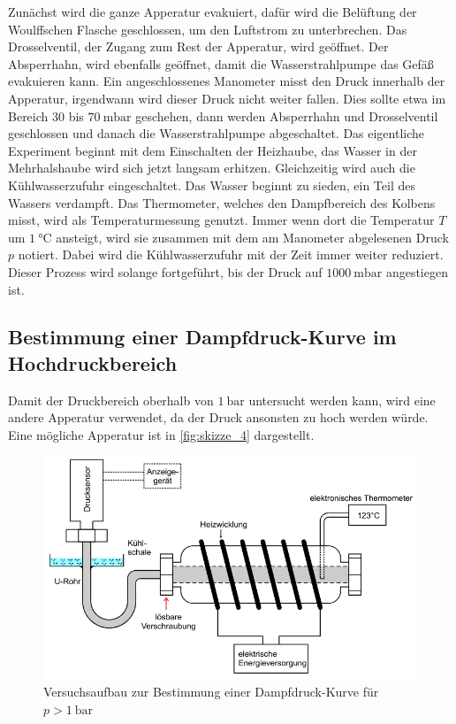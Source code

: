 Zunächst wird die ganze Apperatur evakuiert, dafür wird die Belüftung der Woulffschen Flasche geschlossen, um den Luftstrom zu unterbrechen.
Das Drosselventil, der Zugang zum Rest der Apperatur, wird geöffnet.
Der Absperrhahn, wird ebenfalls geöffnet, damit die Wasserstrahlpumpe das Gefäß evakuieren kann.
Ein angeschlossenes Manometer misst den Druck innerhalb der Apperatur, irgendwann wird dieser Druck nicht weiter fallen.
Dies sollte etwa im Bereich $30$ bis $\SI{70}{\milli\bar}$ geschehen, dann werden Absperrhahn und Drosselventil geschlossen und danach die Wasserstrahlpumpe abgeschaltet.
Das eigentliche Experiment beginnt mit dem Einschalten der Heizhaube, das Wasser in der Mehrhalshaube wird sich jetzt langsam erhitzen.
Gleichzeitig wird auch die Kühlwasserzufuhr eingeschaltet.
Das Wasser beginnt zu sieden, ein Teil des Wassers verdampft.
Das Thermometer, welches den Dampfbereich des Kolbens misst, wird als Temperaturmessung genutzt.
Immer wenn dort die Temperatur $T$ um $\SI{1}{\celsius}$ ansteigt, wird sie zusammen mit dem am Manometer abgelesenen Druck $p$ notiert.
Dabei wird die Kühlwasserzufuhr mit der Zeit immer weiter reduziert.
Dieser Prozess wird solange fortgeführt, bis der Druck auf $\SI{1000}{\milli\bar}$ angestiegen ist.

\subsection{Bestimmung einer Dampfdruck-Kurve im Hochdruckbereich}
\label{sec:Durchführung_hochdruck}

Damit der Druckbereich oberhalb von $\SI{1}{\bar}$ untersucht werden kann, wird eine andere Apperatur verwendet, da der Druck ansonsten zu hoch werden würde.
Eine mögliche Apperatur ist in \autoref{fig:skizze_4} dargestellt.

\begin{figure}
    \centering
    \includegraphics[width=\textwidth/2]{images/bild4.png}
    \caption{Versuchsaufbau zur Bestimmung einer Dampfdruck-Kurve für $p > \SI{1}{\bar}$ \cite{V203}}
    \label{fig:skizze_4}
\end{figure}

